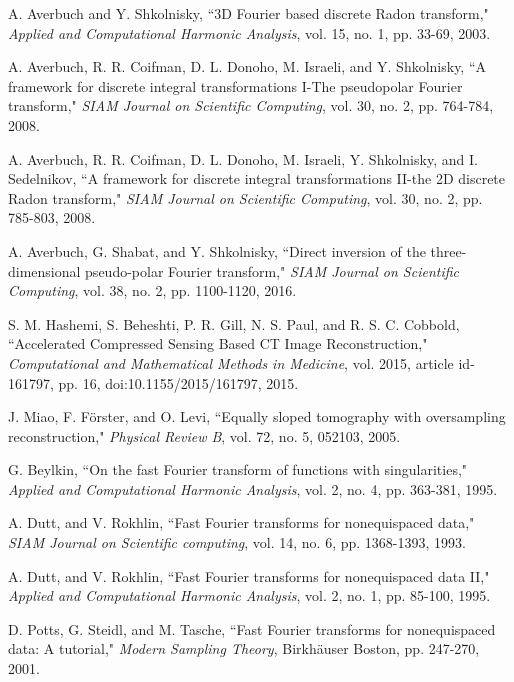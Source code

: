 \documentclass{UCF_ETD}
\begin{document}
\begin{thebibliography}{99}
A. Averbuch and Y. Shkolnisky, ``3D Fourier based discrete Radon transform," \emph{Applied and Computational Harmonic Analysis}, vol. 15, no. 1, pp. 33-69, 2003.

A. Averbuch,  R. R. Coifman, D. L. Donoho, M. Israeli, and Y. Shkolnisky, ``A framework for discrete integral transformations I-The pseudopolar Fourier transform," \emph{SIAM Journal on Scientific Computing}, vol. 30, no. 2, pp. 764-784, 2008.

A. Averbuch,  R. R. Coifman, D. L. Donoho, M. Israeli, Y. Shkolnisky, and I. Sedelnikov, ``A framework for discrete integral transformations II-the 2D discrete Radon transform," \emph{SIAM Journal on Scientific Computing}, vol. 30, no. 2, pp. 785-803, 2008.

A. Averbuch, G. Shabat, and Y. Shkolnisky, ``Direct inversion of the three-dimensional pseudo-polar Fourier transform,"
\emph{SIAM Journal on  Scientific Computing}, vol. 38, no. 2, pp. 1100-1120, 2016.



S. M. Hashemi, S. Beheshti, P. R. Gill, N. S. Paul, and R. S. C. Cobbold, ``Accelerated Compressed Sensing Based CT Image Reconstruction," \emph{Computational and Mathematical Methods in Medicine}, vol. 2015, article id-161797, pp. 16, doi:10.1155/2015/161797, 2015.

J. Miao, F. Förster, and O. Levi, ``Equally sloped tomography with oversampling reconstruction," \emph{Physical Review B}, vol. 72, no. 5, 052103, 2005.

G. Beylkin, ``On the fast Fourier transform of functions with singularities," \emph{Applied and Computational Harmonic Analysis}, vol. 2, no. 4, pp. 363-381, 1995.

A. Dutt, and V. Rokhlin, ``Fast Fourier transforms for nonequispaced data," \emph{SIAM Journal on Scientific computing}, vol. 14, no. 6, pp. 1368-1393, 1993.

A. Dutt, and V. Rokhlin, ``Fast Fourier transforms for nonequispaced data II," \emph{Applied and Computational Harmonic Analysis}, vol. 2, no. 1, pp. 85-100, 1995.

D. Potts, G. Steidl, and M. Tasche, ``Fast Fourier transforms for nonequispaced data: A tutorial," \emph{Modern Sampling Theory}, Birkh\"auser Boston, pp. 247-270, 2001.


\end{thebibliography}
\end{document}
